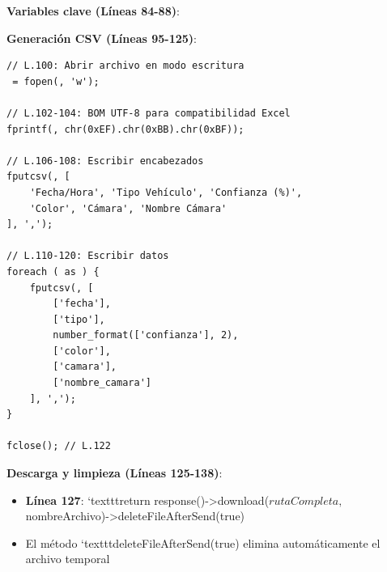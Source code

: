 \textbf{Variables clave (Líneas 84-88)}:

\textbf{Generación CSV (Líneas 95-125)}:
\begin{lstlisting}[style=phpstyle]
// L.100: Abrir archivo en modo escritura
 = fopen(, 'w');

// L.102-104: BOM UTF-8 para compatibilidad Excel
fprintf(, chr(0xEF).chr(0xBB).chr(0xBF));

// L.106-108: Escribir encabezados
fputcsv(, [
    'Fecha/Hora', 'Tipo Vehículo', 'Confianza (%)', 
    'Color', 'Cámara', 'Nombre Cámara'
], ',');

// L.110-120: Escribir datos
foreach ( as ) {
    fputcsv(, [
        ['fecha'],
        ['tipo'],
        number_format(['confianza'], 2),
        ['color'],
        ['camara'],
        ['nombre_camara']
    ], ',');
}

fclose(); // L.122
\end{lstlisting}

\textbf{Descarga y limpieza (Líneas 125-138)}:
\begin{itemize}
    \item \textbf{Línea 127}: `texttt{return response()->download($rutaCompleta, $nombreArchivo)->deleteFileAfterSend(true)}
    \item El método `texttt{deleteFileAfterSend(true)} elimina automáticamente el archivo temporal
\end{itemize}

